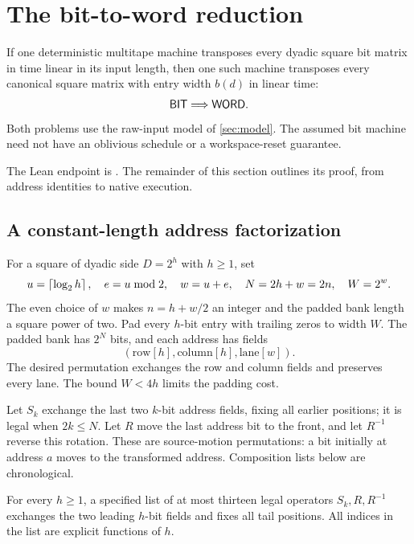 \section{The bit-to-word reduction}
\label{sec:reduction}
\begin{theorem}
\label{thm:bit-word}
If one deterministic multitape machine transposes every dyadic square bit
matrix in time linear in its input length, then one such machine transposes
every canonical square matrix with entry width $b(d)$ in linear time:
\[
                              \mathsf{BIT}\Longrightarrow\mathsf{WORD}.
\]
Both problems use the raw-input model of \cref{sec:model}. The assumed bit
machine need not have an oblivious schedule or a workspace-reset guarantee.
\end{theorem}

The Lean endpoint is
. The remainder of
this section outlines its proof, from address identities to native execution.

\subsection{A constant-length address factorization}
For a square of dyadic side $D=2^h$ with $h\geq1$, set
\[
 u=\left\lceil \log_2 h\right\rceil,\quad e=u\bmod2,\quad w=u+e,\quad
 N=2h+w=2n,\quad W=2^w.
\]
The even choice of $w$ makes $n=h+w/2$ an integer and the padded
bank length a square power of two. Pad every $h$-bit entry with trailing zeros
to width $W$. The padded bank has $2^N$ bits, and each address has fields
\[
                 (\text{row}[h],\text{column}[h],\text{lane}[w]).
\]
The desired permutation exchanges the row and column fields and preserves
every lane. The bound $W<4h$ limits the padding cost.

Let $S_k$ exchange the last two $k$-bit address fields, fixing all earlier
positions; it is legal when $2k\leq N$. Let $R$ move the last address bit
to the front, and let $R^{-1}$ reverse this rotation. These are source-motion
permutations: a bit initially at address $a$ moves to the transformed address.
Composition lists below are chronological.

\begin{lemma}
\label{lem:thirteen}
For every $h\geq1$, a specified list of at most thirteen legal operators
$S_k,R,R^{-1}$ exchanges the two leading $h$-bit fields and fixes all tail
positions. All indices in the list are explicit functions of $h$.
\end{lemma}

